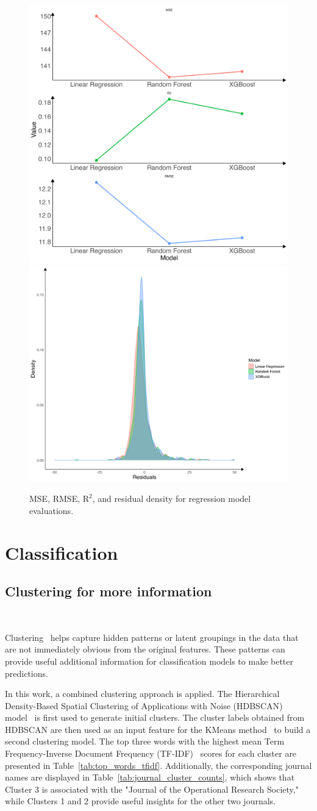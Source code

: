 \documentclass[9pt,twocolumn,twoside]{pnas-new}
\begin{document}
\begin{figure}[!tbhp]
\centering
\includegraphics[width=0.4\linewidth]{regression/resgression.png}
\includegraphics[width=0.58\linewidth]{regression/resgression_res.png}
\caption{MSE, RMSE, $\text{R}^2$, and residual density for regression model evaluations.}
\label{fig:metrics_res}
\end{figure}


\section{Classification}

\subsection*{Clustering for more information} \

Clustering~\cite{cluster} helps capture hidden patterns or latent groupings in the data that are not immediately obvious from the original features. These patterns can provide useful additional information for classification models to make better predictions.

In this work, a combined clustering approach is applied. The Hierarchical Density-Based Spatial Clustering of Applications with Noise (HDBSCAN) model~\cite{10.1145/2733381} is first used to generate initial clusters. The cluster labels obtained from HDBSCAN are then used as an input feature for the KMeans method~\cite{Jin2010} to build a second clustering model. The top three words with the highest mean Term Frequency-Inverse Document Frequency (TF-IDF)~\cite{ref1} scores for each cluster are presented in Table~\ref{tab:top_words_tfidf}. Additionally, the corresponding journal names are displayed in Table~\ref{tab:journal_cluster_counts}, which shows that Cluster 3 is associated with the "Journal of the Operational Research Society," while Clusters 1 and 2 provide useful insights for the other two journals.
\end{document}
